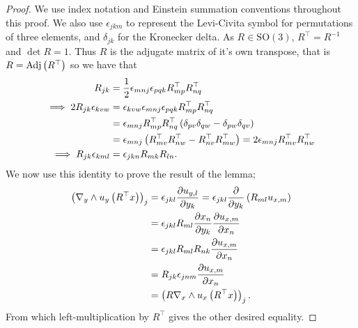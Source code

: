 \begin{proof}
	We use index notation and Einstein summation conventions throughout this proof.
	We also use $\epsilon_{jkm}$ to represent the Levi-Civita symbol for permutations of three elements, and $\delta_{jk}$ for the Kronecker delta.
	As $R\in\mathrm{SO}(3)$, $R^\top=R^{-1}$ and $\det R = 1$.
	Thus $R$ is the adjugate matrix of it's own transpose, that is $R = \mathrm{Adj}\left( R^\top \right)$ so we have that
	\begin{align*}
		R_{jk} &= \frac{1}{2}\epsilon_{mnj}\epsilon_{pqk}R^\top_{mp}R^\top_{nq} \\
		\implies 2R_{jk}\epsilon_{kvw} &= \epsilon_{kvw}\epsilon_{mnj}\epsilon_{pqk}R^\top_{mp}R^\top_{nq} \\
		&= \epsilon_{mnj}R^\top_{mp}R^\top_{nq}\left( \delta_{pv}\delta_{qw} - \delta_{pw}\delta_{qv} \right) \\
		&= \epsilon_{mnj}\left( R^\top_{mv}R^\top_{nw} - R^\top_{nv}R^\top_{mw} \right)
		= 2\epsilon_{mnj}R^\top_{mv}R^\top_{nw} \\
		\implies R_{jk}\epsilon_{kml} &= \epsilon_{jkn}R_{mk}R_{ln}.
	\end{align*}
	We now use this identity to prove the result of the lemma;
	\begin{align*}
		\left( \nabla_y\wedge u_y\left( R^\top x \right) \right)_j &= \epsilon_{jkl}\dfrac{\partial u_{y,l}}{\partial y_k}
		= \epsilon_{jkl}\dfrac{\partial }{\partial y_k}\left( R_{ml}u_{x,m} \right) \\
		&= \epsilon_{jkl}R_{ml}\dfrac{\partial x_n}{\partial y_k}\dfrac{\partial u_{x,m}}{\partial x_n} \\
		&= \epsilon_{jkl}R_{ml}R_{nk}\dfrac{\partial u_{x,m}}{\partial x_n} \\
		&= R_{jk}\epsilon_{jnm}\dfrac{\partial u_{x,m}}{\partial x_n} \\
		&= \left(  R\nabla_x\wedge u_x\left( R^\top x \right)  \right)_j.
	\end{align*}
	From which left-multiplication by $R^\top$ gives the other desired equality.
\end{proof}


